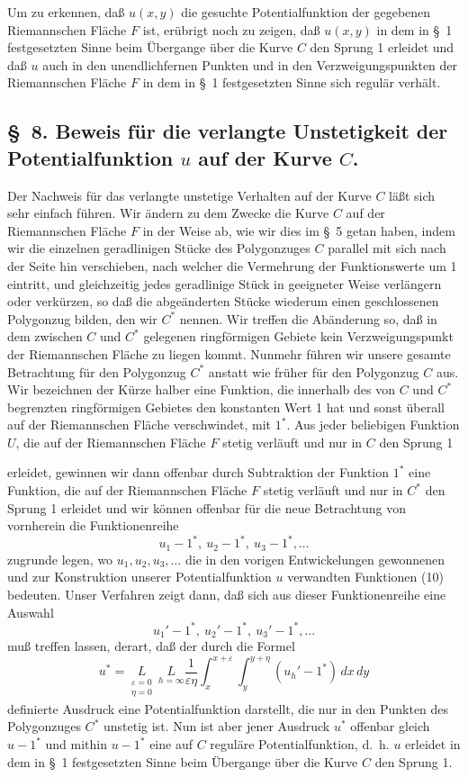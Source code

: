 \documentclass{article}
\begin{document}
Um zu erkennen, daß $u(x, y)$ die gesuchte Potentialfunktion der gegebenen Riemannschen Fläche $F$ ist, erübrigt noch zu zeigen, daß $u(x, y)$ in dem in §~1 festgesetzten Sinne beim Übergange über die Kurve $C$ den Sprung 1 erleidet und daß $u$ auch in den unendlichfernen Punkten und in den Verzweigungspunkten der Riemannschen Fläche $F$ in dem in §~1 festgesetzten Sinne sich regulär verhält.

\subsection*{§~8. Beweis für die verlangte Unstetigkeit der Potentialfunktion $u$ auf der Kurve $C$.}

Der Nachweis für das verlangte unstetige Verhalten auf der Kurve $C$ läßt sich sehr einfach führen. Wir ändern zu dem Zwecke die Kurve $C$ auf der Riemannschen Fläche $F$ in der Weise ab, wie wir dies im §~5 getan haben, indem wir die einzelnen geradlinigen Stücke des Polygonzuges $C$ parallel mit sich nach der Seite hin verschieben, nach welcher die Vermehrung der Funktionswerte um 1 eintritt, und gleichzeitig jedes geradlinige Stück in geeigneter Weise verlängern oder verkürzen, so daß die abgeänderten Stücke wiederum einen geschlossenen Polygonzug bilden, den wir $C^*$ nennen. Wir treffen die Abänderung so, daß in dem zwischen $C$ und $C^*$ gelegenen ringförmigen Gebiete kein Verzweigungspunkt der Riemannschen Fläche zu liegen kommt. Nunmehr führen wir unsere gesamte Betrachtung für den Polygonzug $C^*$ anstatt wie früher für den Polygonzug $C$ aus. Wir bezeichnen der Kürze halber eine Funktion, die innerhalb des von $C$ und $C^*$ begrenzten ringförmigen Gebietes den konstanten Wert 1 hat und sonst überall auf der Riemannschen Fläche verschwindet, mit $1^*$. Aus jeder beliebigen Funktion $U$, die auf der Riemannschen Fläche $F$ stetig verläuft und nur in $C$ den Sprung 1

erleidet, gewinnen wir dann offenbar durch Subtraktion der Funktion $1^*$ eine Funktion, die auf der Riemannschen Fläche $F$ stetig verläuft und nur in $C^*$ den Sprung 1 erleidet und wir können offenbar für die neue Betrachtung von vornherein die Funktionenreihe
\[
u_1 - 1^*, \ u_2 - 1^*, \ u_3 - 1^*, \dots
\]
zugrunde legen, wo $u_1, u_2, u_3, \dots$ die in den vorigen Entwickelungen gewonnenen und zur Konstruktion unserer Potentialfunktion $u$ verwandten Funktionen (10) bedeuten. Unser Verfahren zeigt dann, daß sich aus dieser Funktionenreihe eine Auswahl
\[
u_1' - 1^*, \ u_2' - 1^*, \ u_3' - 1^*, \dots
\]
muß treffen lassen, derart, daß der durch die Formel
\[
u^* = \underset{\substack{\varepsilon=0 \\ \eta=0}}{L} \ \underset{h=\infty}{L} \frac{1}{\varepsilon\eta} \int_x^{x+\varepsilon} \int_y^{y+\eta} (u_h' - 1^*)\,dx\,dy
\]
definierte Ausdruck eine Potentialfunktion darstellt, die nur in den Punkten des Polygonzuges $C^*$ unstetig ist. Nun ist aber jener Ausdruck $u^*$ offenbar gleich $u - 1^*$ und mithin $u - 1^*$ eine auf $C$ reguläre Potentialfunktion, d.~h. $u$ erleidet in dem in §~1 festgesetzten Sinne beim Übergange über die Kurve $C$ den Sprung 1.
\end{document}
